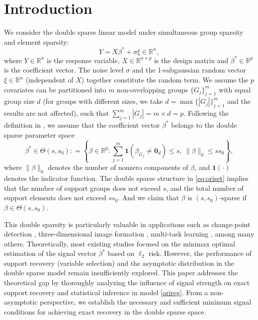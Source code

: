 \documentclass[12pt]{article}
\begin{document}
\section{Introduction}\label{sec:intro}
We consider the double sparse linear model under simultaneous group sparsity and element sparsity:
\begin{equation}\label{orireg}
    Y = X \beta^*  + \sigma \xi \in \mathbb R^n,
\end{equation}
where $Y \in \mathbb{R}^n$ is the response variable, $X \in \mathbb R^{n\times p}$ is the design matrix and $\beta^* \in \mathbb{R}^p$ is the coefficient vector. The noise level $\sigma$ and the 1-subgaussian random vector $\xi \in \mathbb{R}^n$ (independent of $X$) together constitute the random term. 
We assume the $p$ covariates can be partitioned into $m$ non-overlapping groups $\{G_j\}_{j=1}^m$ with equal group size $d$ (for groups with different sizes, we take $d=\max\{ |G_j| \}_{j=1}^m$ and the results are not affected), such that $\sum_{j=1}^m |G_j|=m \times d=p$. 
Following the definition in \cite{CZ22}, we assume that the coefficient vector $\beta^*$ belongs to the double sparse parameter space 
\begin{equation}\label{eq:oriset}
\beta^* \in  {\Theta}(s,s_0): = \left\{ \beta \in \mathbb R^p:  \sum_{j=1}^m \mathbf1(\beta_{G_j}\ne \mathbf 0_d)\le s, ~ \|\beta\|_0 \le s s_0 \right\},
\end{equation}
where $\| \beta\|_0$ denotes the number of nonzero components of $\beta$, and $\mathbf 1 (\cdot)$ denotes the indicator function.
The double sparse structure in \eqref{eq:oriset} implies that the number of support groups does not exceed $s$, and the total number of support elements does not exceed $ss_0$.
And we claim that $\beta$ is $(s,s_0)$-sparse if $\beta \in  {\Theta}(s,s_0)$.

This double sparsity is particularly valuable in applications such as change-point detection \cite{Zhang15change, hao22twt}, three-dimensional image formation \cite{rs14163945}, multi-task learning \cite{abra2024sgam}, among many others.
Theoretically, most existing studies \citep{CZ22, LZ22, ZL23, LZ23} focused on the minimax optimal estimation of the signal vector $\beta^*$ based on $\ell_2$ risk. 
However, the performance of support recovery (variable selection) and the asymptotic distribution in the double sparse model remain insufficiently explored.
This paper addresses the theoretical gap by thoroughly analyzing the influence of signal strength on exact support recovery and statistical inference in model \eqref{orireg}.
From a non-asymptotic perspective, we establish the necessary and sufficient minimum signal conditions for achieving exact recovery in the double sparse space.
\end{document}
